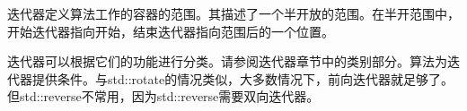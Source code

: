 迭代器定义算法工作的容器的范围。其描述了一个半开放的范围。在半开范围中，开始迭代器指向开始，结束迭代器指向范围后的一个位置。

迭代器可以根据它们的功能进行分类。请参阅迭代器章节中的类别部分。算法为迭代器提供条件。与std::rotate的情况类似，大多数情况下，前向迭代器就足够了。但std::reverse不常用，因为std::reverse需要双向迭代器。
















